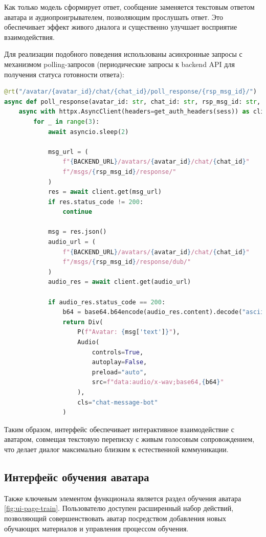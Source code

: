 Как только модель сформирует ответ, сообщение заменяется текстовым ответом аватара и 
аудиопроигрывателем, позволяющим прослушать ответ. Это обеспечивает эффект живого диалога и 
существенно улучшает восприятие взаимодействия.


Для реализации подобного поведения использованы асинхронные запросы с механизмом 
polling-запросов (периодические запросы к backend API для получения статуса готовности ответа):

\begin{lstlisting}[language=Python, numbers=none, frame=none]
@rt("/avatar/{avatar_id}/chat/{chat_id}/poll_response/{rsp_msg_id}/")
async def poll_response(avatar_id: str, chat_id: str, rsp_msg_id: str, sess):
    async with httpx.AsyncClient(headers=get_auth_headers(sess)) as client:
        for _ in range(3):
            await asyncio.sleep(2)

            msg_url = (
                f"{BACKEND_URL}/avatars/{avatar_id}/chat/{chat_id}"
                f"/msgs/{rsp_msg_id}/response/"
            )
            res = await client.get(msg_url)
            if res.status_code != 200:
                continue

            msg = res.json()
            audio_url = (
                f"{BACKEND_URL}/avatars/{avatar_id}/chat/{chat_id}"
                f"/msgs/{rsp_msg_id}/response/dub/"
            )
            audio_res = await client.get(audio_url)

            if audio_res.status_code == 200:
                b64 = base64.b64encode(audio_res.content).decode("ascii")
                return Div(
                    P(f"Avatar: {msg['text']}"),
                    Audio(
                        controls=True,
                        autoplay=False,
                        preload="auto",
                        src=f"data:audio/x-wav;base64,{b64}"
                    ),
                    cls="chat-message-bot"
                )
\end{lstlisting}


Таким образом, интерфейс обеспечивает интерактивное взаимодействие с аватаром, совмещая текстовую 
переписку с живым голосовым сопровождением, что делает диалог максимально близким к естественной 
коммуникации.

\subsection{Интерфейс обучения аватара}
Также ключевым элементом функционала является раздел обучения аватара \ref{fig:ui-page-train}. Пользователю 
доступен расширенный набор действий, позволяющий совершенствовать аватар посредством добавления новых 
обучающих материалов и управления процессом обучения.


